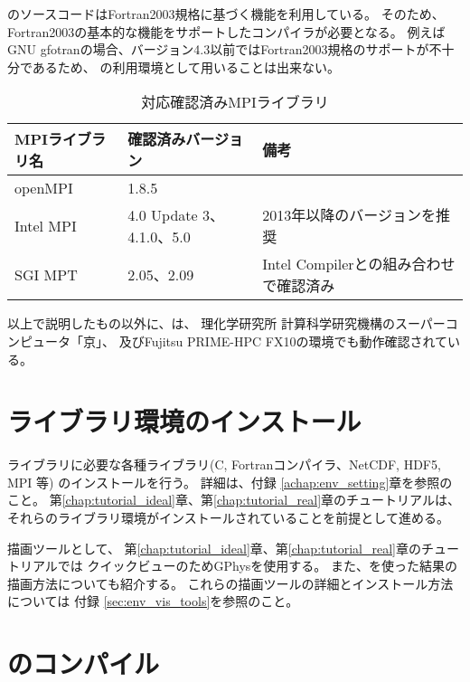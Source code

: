 \scalelib のソースコードはFortran2003規格に基づく機能を利用している。
そのため、Fortran2003の基本的な機能をサポートしたコンパイラが必要となる。
例えばGNU gfotranの場合、バージョン4.3以前ではFortran2003規格のサポートが不十分であるため、
\scalelib の利用環境として用いることは出来ない。

\begin{table}[htb]
\begin{center}
\caption{対応確認済みMPIライブラリ}
\begin{tabularx}{150mm}{|l|l|X|} \hline
 \rowcolor[gray]{0.9} MPIライブラリ名 & 確認済みバージョン & 備考 \\ \hline
 openMPI   & 1.8.5                    & \\ \hline
 Intel MPI & 4.0 Update 3、4.1.0、5.0 & 2013年以降のバージョンを推奨 \\ \hline
 SGI MPT   & 2.05、2.09               & Intel Compilerとの組み合わせで確認済み \\ \hline
\end{tabularx}
\label{tab:compatible_mpi}
\end{center}
\end{table}

以上で説明したもの以外に、\scalelib は、
理化学研究所 計算科学研究機構のスーパーコンピュータ「京」、
及びFujitsu PRIME-HPC FX10の環境でも動作確認されている。


\section{ライブラリ環境のインストール} \label{sec:inst_env}
\scalelib ライブラリに必要な各種ライブラリ(C, Fortranコンパイラ、NetCDF, HDF5, MPI 等)
のインストールを行う。
詳細は、付録 \ref{achap:env_setting}章を参照のこと。
第\ref{chap:tutorial_ideal}章、第\ref{chap:tutorial_real}章のチュートリアルは、
それらのライブラリ環境がインストールされていることを前提として進める。

描画ツールとして、
第\ref{chap:tutorial_ideal}章、第\ref{chap:tutorial_real}章のチュートリアルでは
クイックビューのためGPhysを使用する。
また、\grads を使った結果の描画方法についても紹介する。
これらの描画ツールの詳細とインストール方法については
付録 \ref{sec:env_vis_tools}を参照のこと。



\section{\scalelib のコンパイル} \label{sec:scale_compile}

